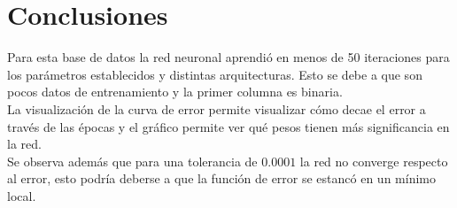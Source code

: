 \documentclass[12pt,letterpaper]{article}
\theoremstyle{definition}
\theoremstyle{definition}
\theoremstyle{definition}
\theoremstyle{definition}
\theoremstyle{definition}
\theoremstyle{definition}
\begin{document}
	\section{Conclusiones}
	Para esta base de datos la red neuronal aprendió en menos de 50 iteraciones para los parámetros establecidos y distintas arquitecturas. Esto se debe a que son pocos datos de entrenamiento y la primer columna es binaria.\\
	La visualización de la curva de error permite visualizar cómo decae el error a través de las épocas y el gráfico permite ver qué pesos tienen más significancia en la red.\\
	Se observa además que para una tolerancia de $ 0.0001 $ la red no converge respecto al error, esto podría deberse a que la función de error se estancó en un mínimo local.
\end{document}
